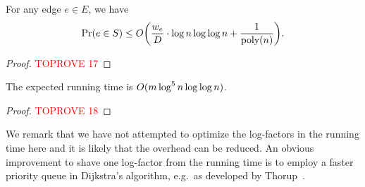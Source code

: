 \documentclass[letterpaper,11pt]{article}
\begin{document}
\begin{lemma} \label{lem:ldd-fast-prob}
For any edge $e \in E$, we have
\begin{equation*}
    \Pr(e \in S) \leq \Order\parens*{\frac{w_e}{D} \cdot \log n \log\log n + \frac{1}{\poly(n)}}.
\end{equation*}
\end{lemma}
\begin{proof}\textcolor{red}{TOPROVE 17}\end{proof}

\begin{lemma} \label{lem:ldd-fast-time}
The expected running time is $O(m \log^5 n \log\log n)$.
\end{lemma}
\begin{proof}\textcolor{red}{TOPROVE 18}\end{proof}

We remark that we have not attempted to optimize the log-factors in the running time here and it is likely that the overhead can be reduced. An obvious improvement to shave one log-factor from the running time is to employ a faster priority queue in Dijkstra's algorithm, e.g.\ as developed by Thorup~\cite{Thorup03}. 

\end{document}
